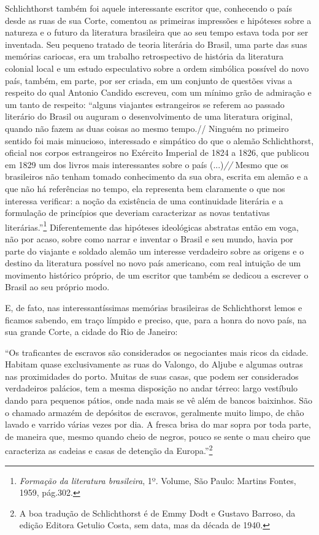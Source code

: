 Schlichthorst também foi aquele interessante escritor que, conhecendo o
país desde as ruas de sua Corte, comentou as primeiras impressões e
hipóteses sobre a natureza e o futuro da literatura brasileira que ao
seu tempo estava toda por ser inventada. Seu pequeno tratado de teoria
literária do Brasil, uma parte das suas memórias cariocas, era um
trabalho retrospectivo de história da literatura colonial local e um
estudo especulativo sobre a ordem simbólica possível do novo país,
também, em parte, por ser criada, em um conjunto de questões vivas a
respeito do qual Antonio Candido escreveu, com um mínimo grão de
admiração e um tanto de respeito: ``alguns viajantes estrangeiros se
referem ao passado literário do Brasil ou auguram o desenvolvimento de
uma literatura original, quando não fazem as duas coisas ao mesmo
tempo.// Ninguém no primeiro sentido foi mais minucioso, interessado e
simpático do que o alemão Schlichthorst, oficial nos corpos estrangeiros
no Exército Imperial de 1824 a 1826, que publicou em 1829 um dos livros
mais interessantes sobre o país (...)\emph{//} Mesmo que os brasileiros
não tenham tomado conhecimento da sua obra, escrita em alemão e a que
não há referências no tempo, ela representa bem claramente o que nos
interessa verificar: a noção da existência de uma continuidade literária
e a formulação de princípios que deveriam caracterizar as novas
tentativas literárias.''\footnote{\emph{Formação da literatura
  brasileira}, 1º. Volume, São Paulo: Martins Fontes, 1959, pág.302.}
Diferentemente das hipóteses ideológicas abstratas então em voga, não
por acaso, sobre como narrar e inventar o Brasil e seu mundo, havia por
parte do viajante e soldado alemão um interesse verdadeiro sobre as
origens e o destino da literatura possível no novo país americano, com
real intuição de um movimento histórico próprio, de um escritor que
também se dedicou a escrever o Brasil ao seu próprio modo.

E, de fato, nas interessantíssimas memórias brasileiras de Schlichthorst
lemos e ficamos sabendo, em traço límpido e preciso, que, para a honra
do novo país, na sua grande Corte, a cidade do Rio de Janeiro:

``Os traficantes de escravos são considerados os negociantes mais ricos
da cidade. Habitam quase exclusivamente as ruas do Valongo, do Aljube e
algumas outras nas proximidades do porto. Muitas de suas casas, que
podem ser considerados verdadeiros palácios, tem a mesma disposição no
andar térreo: largo vestíbulo dando para pequenos pátios, onde nada mais
se vê além de bancos baixinhos. São o chamado armazém de depósitos de
escravos, geralmente muito limpo, de chão lavado e varrido várias vezes
por dia. A fresca brisa do mar sopra por toda parte, de maneira que,
mesmo quando cheio de negros, pouco se sente o mau cheiro que
caracteriza as cadeias e casas de detenção da Europa.''\footnote{A boa
  tradução de Schlichthorst é de Emmy Dodt e Gustavo Barroso, da edição
  Editora Getulio Costa, sem data, mas da década de 1940.}

